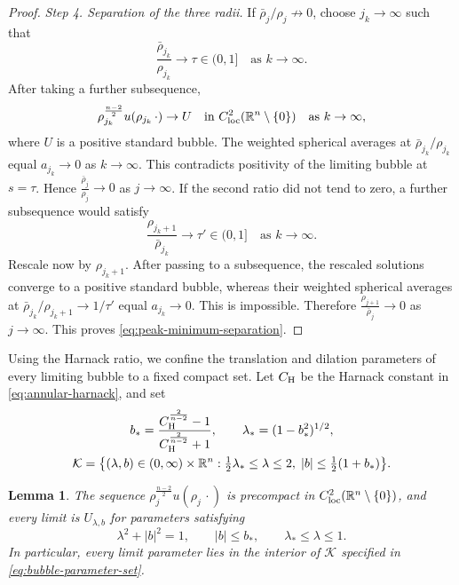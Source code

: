 \documentclass[11pt]{article}
\numberwithin{equation}{section}
\newtheorem{lemma}[theorem]{Lemma}
\theoremstyle{remark}
\newcommand{\R}{\mathbb R}
\begin{document}
\begin{proof}
\emph{Step 4. Separation of the three radii.}
If \(\bar\rho_j/\rho_j\not\to0\), choose \(j_k\to\infty\) such that
\[
 \frac{\bar\rho_{j_k}}{\rho_{j_k}}
 \to\tau\in(0,1]
 \quad\text{as }k\to\infty.
\]
After taking a further subsequence,
\[
 \rho_{j_k}^{\frac{n-2}{2}}u(\rho_{j_k}\,\cdot)
 \to U
 \quad\text{in }C^2_{\rm loc}(\R^n\setminus\{0\})
 \quad\text{as }k\to\infty,
\]
where \(U\) is a positive standard bubble. The weighted spherical averages
at \(\bar\rho_{j_k}/\rho_{j_k}\) equal
\(a_{j_k}\to0\) as \(k\to\infty\). This contradicts
positivity of the limiting bubble at \(s=\tau\). Hence \(\frac{\bar\rho_j}{\rho_j}\to0\) as \(j\to\infty\).
If the second ratio did not tend to zero, a further subsequence would satisfy
\[
 \frac{\rho_{j_k+1}}{\bar\rho_{j_k}}
 \to\tau'\in(0,1]
 \quad\text{as }k\to\infty.
\]
{Rescale now by \(\rho_{j_k+1}\).  After passing to a
subsequence, the rescaled solutions converge to a positive standard bubble,
whereas their weighted spherical averages at
\(\bar\rho_{j_k}/\rho_{j_k+1}\to1/\tau'\) equal \(a_{j_k}\to0\).
This is impossible.} Therefore \(\frac{\rho_{j+1}}{\bar\rho_j}\to0\) as \(j\to\infty\).
This proves
\eqref{eq:peak-minimum-separation}.
\end{proof}

Using the Harnack ratio, we confine the translation and
dilation parameters of every limiting bubble to a fixed compact set.
Let \(C_{\rm H}\) be the Harnack
constant in
\eqref{eq:annular-harnack}, and set
\begin{equation}\label{eq:bubble-parameter-set}
 \begin{gathered}
 b_*=
 \frac{C_{\rm H}^{\frac{2}{n-2}}-1}{C_{\rm H}^{\frac{2}{n-2}}+1},
 \qquad
 \lambda_*=(1-b_*^2)^{1/2},\\
 \mathcal K=\bigl\{
 (\lambda,b)\in(0,\infty)\times\R^n:
 \tfrac12\lambda_*\le\lambda\le2,\;
 |b|\le\tfrac12(1+b_*)
 \bigr\}.
 \end{gathered}
\end{equation}

\par
\begin{lemma}\label{lem:peak-bubble-compactness}
The sequence \(\rho_j^{\frac{n-2}{2}}u(\rho_j\,\cdot)\) is precompact in
\(C^2_{\rm loc}(\R^n\setminus\{0\})\), and every limit is
\(U_{\lambda,b}\) for parameters satisfying
\begin{equation}\label{eq:peak-limit-parameter-bounds}
 \lambda^2+|b|^2=1,\qquad
 |b|\le b_*,\qquad
 \lambda_*\le\lambda\le1.
\end{equation}
In particular, every limit parameter lies in the interior of
\(\mathcal K\) specified in \eqref{eq:bubble-parameter-set}.
\end{lemma}
\end{document}
